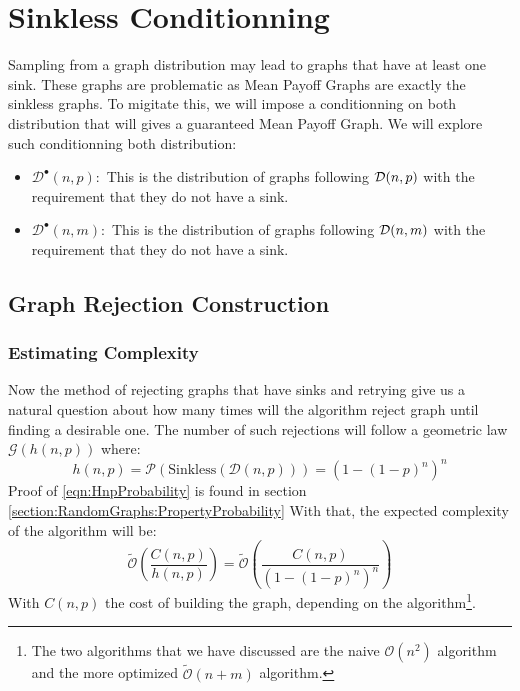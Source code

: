 \section{Sinkless Conditionning}
Sampling from a graph distribution may lead to graphs that have at least one sink. 
\newline These graphs are problematic as Mean Payoff Graphs are exactly the sinkless graphs.
\newline To migitate this, we will impose a conditionning on both distribution that will gives a guaranteed Mean Payoff Graph.
\newline We will explore such conditionning both distribution:
\begin{itemize}
	\item $\mathcal{D}^\bullet(n,p):$ This is the distribution of graphs following $\mathcal{D}(n,p)$ with the requirement that they do not have a sink.
	\item $\mathcal{D}^\bullet(n,m):$ This is the distribution of graphs following $\mathcal{D}(n,m)$ with the requirement that they do not have a sink.
\end{itemize}
\subsection{Graph Rejection Construction}
\subsubsection{Estimating Complexity}
Now the method of rejecting graphs that have sinks and retrying give us a natural question about how many times will the algorithm reject graph until finding a desirable one.\newline
The number of such rejections will follow a geometric law $\mathcal{G}(h(n,p))$ where: 
\begin{equation}
	\label{eqn:HnpProbability}
	h(n,p)=\mathscr{P}\left(\text{Sinkless}(\mathcal{D}(n,p))\right)=(1-(1-p)^n)^n
\end{equation}
Proof of \eqref{eqn:HnpProbability} is found in section \ref{section:RandomGraphs:PropertyProbability}
\newline With that, the expected complexity of the algorithm will be:
$$
\tilde{\mathcal{O}}\left(\frac{C(n,p)}{h(n,p)}\right)=\tilde{\mathcal{O}}\left(\frac{C(n,p)}{(1-(1-p)^n)^n}\right)
$$
With $C(n,p)$ the cost of building the graph, depending on the algorithm\footnote{The two algorithms that we have discussed are the naive $\mathcal{O}(n^2)$ algorithm and the more optimized $\tilde{\mathcal{O}}(n+m)$ algorithm.}.
